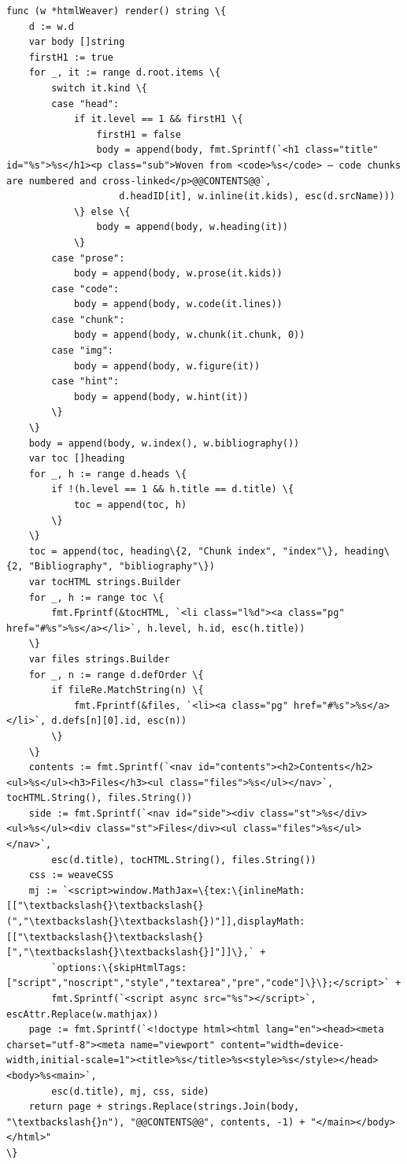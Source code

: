 \documentclass[10pt,a4paper]{article}
\newcounter{chunk}
\begin{document}
\begin{Verbatim}
func (w *htmlWeaver) render() string \{
	d := w.d
	var body []string
	firstH1 := true
	for _, it := range d.root.items \{
		switch it.kind \{
		case "head":
			if it.level == 1 && firstH1 \{
				firstH1 = false
				body = append(body, fmt.Sprintf(`<h1 class="title" id="%s">%s</h1><p class="sub">Woven from <code>%s</code> — code chunks are numbered and cross-linked</p>@@CONTENTS@@`,
					d.headID[it], w.inline(it.kids), esc(d.srcName)))
			\} else \{
				body = append(body, w.heading(it))
			\}
		case "prose":
			body = append(body, w.prose(it.kids))
		case "code":
			body = append(body, w.code(it.lines))
		case "chunk":
			body = append(body, w.chunk(it.chunk, 0))
		case "img":
			body = append(body, w.figure(it))
		case "hint":
			body = append(body, w.hint(it))
		\}
	\}
	body = append(body, w.index(), w.bibliography())
	var toc []heading
	for _, h := range d.heads \{
		if !(h.level == 1 && h.title == d.title) \{
			toc = append(toc, h)
		\}
	\}
	toc = append(toc, heading\{2, "Chunk index", "index"\}, heading\{2, "Bibliography", "bibliography"\})
	var tocHTML strings.Builder
	for _, h := range toc \{
		fmt.Fprintf(&tocHTML, `<li class="l%d"><a class="pg" href="#%s">%s</a></li>`, h.level, h.id, esc(h.title))
	\}
	var files strings.Builder
	for _, n := range d.defOrder \{
		if fileRe.MatchString(n) \{
			fmt.Fprintf(&files, `<li><a class="pg" href="#%s">%s</a></li>`, d.defs[n][0].id, esc(n))
		\}
	\}
	contents := fmt.Sprintf(`<nav id="contents"><h2>Contents</h2><ul>%s</ul><h3>Files</h3><ul class="files">%s</ul></nav>`, tocHTML.String(), files.String())
	side := fmt.Sprintf(`<nav id="side"><div class="st">%s</div><ul>%s</ul><div class="st">Files</div><ul class="files">%s</ul></nav>`,
		esc(d.title), tocHTML.String(), files.String())
	css := weaveCSS
	mj := `<script>window.MathJax=\{tex:\{inlineMath:[["\textbackslash{}\textbackslash{}(","\textbackslash{}\textbackslash{})"]],displayMath:[["\textbackslash{}\textbackslash{}[","\textbackslash{}\textbackslash{}]"]]\},` +
		`options:\{skipHtmlTags:["script","noscript","style","textarea","pre","code"]\}\};</script>` +
		fmt.Sprintf(`<script async src="%s"></script>`, escAttr.Replace(w.mathjax))
	page := fmt.Sprintf(`<!doctype html><html lang="en"><head><meta charset="utf-8"><meta name="viewport" content="width=device-width,initial-scale=1"><title>%s</title>%s<style>%s</style></head><body>%s<main>`,
		esc(d.title), mj, css, side)
	return page + strings.Replace(strings.Join(body, "\textbackslash{}n"), "@@CONTENTS@@", contents, -1) + "</main></body></html>"
\}
\end{Verbatim}
\end{document}
